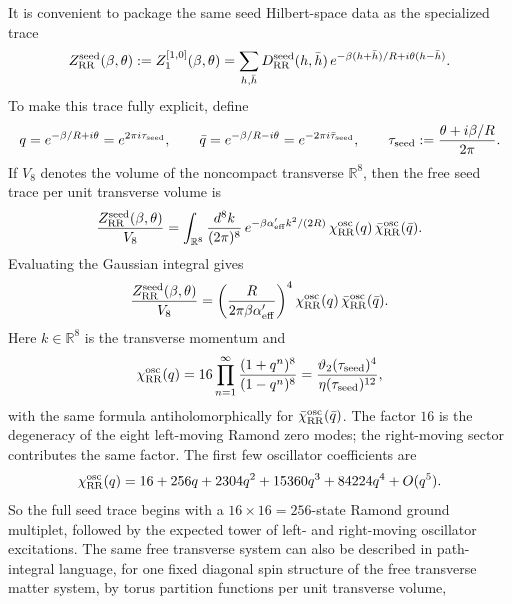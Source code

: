 \documentclass[11pt]{article}
\newcommand{\Aeff}{\alpha'_{\mathrm{eff}}}
\newcommand{\bR}{\mathbb{R}}
\begin{document}
It is convenient to package the same seed Hilbert-space data as the specialized trace
\begin{equation}\label{eq:seed-rr-trace}
Z_{\rm RR}^{\mathrm{seed}}(\beta,\theta)
:=
Z_1^{[1,0]}(\beta,\theta)
=
\sum_{h,\bar h} D_{\rm RR}^{\mathrm{seed}}(h,\bar h)\,
e^{-\beta(h+\bar h)/R+i\theta(h-\bar h)}.
\end{equation}
To make this trace fully explicit, define
\begin{equation}\label{eq:seed-thermal-modulus}
q=e^{-\beta/R+i\theta}=e^{2\pi i\tau_{\rm seed}},
\qquad
\bar q=e^{-\beta/R-i\theta}=e^{-2\pi i\bar\tau_{\rm seed}},
\qquad
\tau_{\rm seed}:=\frac{\theta+i\beta/R}{2\pi}.
\end{equation}
If $V_8$ denotes the volume of the noncompact transverse $\bR^8$, then the free seed trace per unit transverse volume is
\begin{equation}\label{eq:seed-rr-factorized}
\frac{Z_{\rm RR}^{\mathrm{seed}}(\beta,\theta)}{V_8}
=
\int_{\bR^8}\frac{d^8k}{(2\pi)^8}\,
e^{-\beta \Aeff k^2/(2R)}\,
\chi^{\mathrm{osc}}_{\rm RR}(q)\,
\bar\chi^{\mathrm{osc}}_{\rm RR}(\bar q).
\end{equation}
Evaluating the Gaussian integral gives
\begin{equation}\label{eq:seed-rr-gaussian}
\frac{Z_{\rm RR}^{\mathrm{seed}}(\beta,\theta)}{V_8}
=
\left(\frac{R}{2\pi \beta \Aeff}\right)^4
\chi^{\mathrm{osc}}_{\rm RR}(q)\,
\bar\chi^{\mathrm{osc}}_{\rm RR}(\bar q).
\end{equation}
Here $k\in \bR^8$ is the transverse momentum and
\begin{equation}\label{eq:seed-rr-oscillator}
\chi^{\mathrm{osc}}_{\rm RR}(q)
=
16\prod_{n=1}^\infty \frac{(1+q^n)^8}{(1-q^n)^8}
=
\frac{\vartheta_2(\tau_{\rm seed})^4}{\eta(\tau_{\rm seed})^{12}},
\end{equation}
with the same formula antiholomorphically for $\bar\chi^{\mathrm{osc}}_{\rm RR}(\bar q)$. The factor $16$ is the degeneracy of the eight left-moving Ramond zero modes; the right-moving sector contributes the same factor.
The first few oscillator coefficients are
\begin{equation}\label{eq:seed-rr-oscillator-expansion}
\chi^{\mathrm{osc}}_{\rm RR}(q)
=
16+256q+2304q^2+15360q^3+84224q^4+O(q^5).
\end{equation}
So the full seed trace begins with a $16\times 16=256$-state Ramond ground multiplet, followed by the expected tower of left- and right-moving oscillator excitations.
The same free transverse system can also be described in path-integral language, for one fixed diagonal spin structure of the free transverse matter system, by torus partition functions per unit transverse volume,
\end{document}
